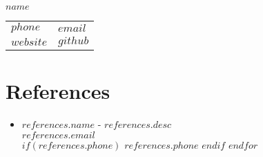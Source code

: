 \documentclass[$fontsize$, letterpaper]{article}
\newcommand{\blue}[1]{\textcolor{PrimaryBlue}{#1}}
\begin{document}
\begin{multicols}{2}
    \hspace*{-0.08cm}\blue{\fontsize{42}{50}\selectfont $name$}
    \columnbreak
    \begin{table}[H]
        \begin{tabular}{ll}
            \vspace*{0.06cm}
            \blue{$phone$} & \href{mailto:$email$}{$email$}  \\
            \href{https://$website$}{$website$} & \href{https://$github$}{$github$}
        \end{tabular}
    \end{table}
\end{multicols}

\section*{References}
\begin{itemize}
    $for(references)$
        \item \large{
            \textbf{$references.name$} - {$references.desc$}\\
            {$references.email$} \\
            {$if(references.phone)$}
                {$references.phone$}
            {$endif$}
            \vspace*{0.5cm}
        }
    $endfor$
\end{itemize}
\end{document}
